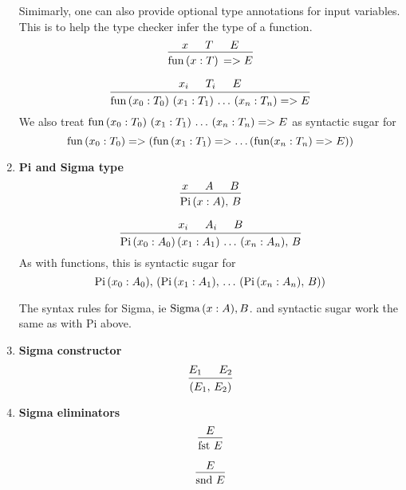 \documentclass{article}
\begin{document}
\begin{enumerate}
  Simimarly, one can also provide optional type annotations for input variables.
  This is to help the type checker infer the type of a function.
  \[
    \begin{prooftree}
      \hypo{x}
      \hypo{T}
      \hypo{E}
      \infer3{\fun \, (x : T) \, => E}
    \end{prooftree}
  \]

  \[
    \begin{prooftree}
      \hypo{x_i}
      \hypo{T_i}
      \hypo{E}
      \infer3{\fun \, (x_0 : T_0) \,\, (x_1 : T_1) \, \dots \, (x_n : T_n) => E}
    \end{prooftree}
  \]
  We also treat $\operatorname{fun} \, (x_0 : T_0) \,\, (x_1 : T_1) \, \dots \, (x_n : T_n) => E$
  as syntactic sugar for
  \[ \operatorname{fun} \, (x_0 : T_0) => (\operatorname{fun} \, (x_1 : T_1) => \dots (\operatorname{fun} (x_n : T_n) => E)) \]

\item \textbf{Pi and Sigma type} \\
  \[
    \begin{prooftree}
      \hypo{x}
      \hypo{A}
      \hypo{B}
      \infer3{\Pii \, (x : A), \, B}
    \end{prooftree}
  \] 

  \[
    \begin{prooftree}
      \hypo{x_i}
      \hypo{A_i}
      \hypo{B}
      \infer3{\Pii \, (x_0 : A_0) \, (x_1 : A_1) \, \dots \, (x_n : A_n), \, B}
    \end{prooftree}
  \] 
  As with functions, this is syntactic sugar for
  \[ \operatorname{Pi} \, (x_0 : A_0), \, (\operatorname{Pi} \, (x_1 : A_1), \,  \dots \, (\operatorname{Pi} \, (x_n : A_n), \, B)) \]

  The syntax rules for Sigma, ie $\operatorname{Sigma}\, (x : A), B$. and syntactic sugar work
  the same as with Pi above. 

  \item \textbf{Sigma constructor} \\
  \[
    \begin{prooftree}
      \hypo{E_1}
      \hypo{E_2}
      \infer2{(E_1, \, E_2)}
    \end{prooftree}  
  \]

  \item \textbf{Sigma eliminators} \\
  \[
    \begin{prooftree}
      \hypo{E}
      \infer1{\fst \, E}
    \end{prooftree}
  \]

  \[
   \begin{prooftree}
    \hypo{E}
    \infer1{\snd \, E}
   \end{prooftree}
 \]


\end{enumerate}
\end{document}
